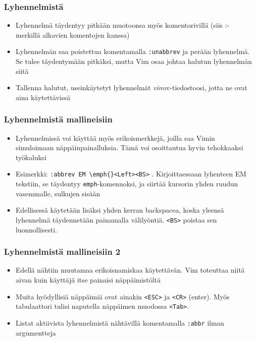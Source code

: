 \documentclass[]{beamer}
\newcommand{\Tohj}[1]{\texttt{#1}}
\newcommand{\com}[1]{{\color{blue!50!black}\Tohj{#1}} \!\!}
\newcommand{\code}[1]{\texttt{#1}}
\begin{document}
\begin{frame}
    \frametitle{Lyhennelmistä}
    \begin{itemize}
        \item Lyhennelmä täydentyy pitkään muotoonsa myös komentorivillä (siis :-merkillä alkavien komentojen kanssa)
        \item Lyhennelmän saa poistettua komentamalla \com{:unabbrev} ja perään lyhennelmä. Se tulee täydentymään pitkäksi, mutta Vim osaa johtaa halutun lyhennelmän siitä
        \item Tallenna halutut, useinkäytetyt lyhennelmät \emph{vimrc}-tiedostoosi, jotta ne ovat aina käytettävissä
    \end{itemize}
\end{frame}

\begin{frame}
    \frametitle{Lyhennelmistä mallineisiin}
    \begin{itemize}
        \item Lyhennelmissä voi käyttää myös erikoismerkkejä, joilla saa Vimin simuloimaan näppäinpainalluksia. Tämä voi osoittautua hyvin tehokkaaksi työkaluksi
        \pause
        \item Esimerkki: \com{:abbrev EM \textbackslash emph\{\}<Left><BS>}. Kirjoittaessaan lyhenteen EM tekstiin, se täydentyy \code{emph}-komennoksi, ja siirtää kursorin yhden ruudun vasemmalle, sulkujen sisään
        \pause
        \item Edellisessä käytetään lisäksi yhden kerran backspacea, koska yleensä lyhennelmä täydennetään painamalla välilyöntiä. \code{<BS>} poistaa sen luonnollisesti.
    \end{itemize}
\end{frame}

\begin{frame}
    \frametitle{Lyhennelmistä mallineisiin 2}
    \begin{itemize}
        \item Edellä nähtiin muutamaa erikoisnamiskaa käytettävän. Vim toteuttaa niitä aivan kuin käyttäjä itse painaisi näppäimistöltä
        \item Muita hyödyllisiä näppäimiä ovat ainakin \code{<ESC>} ja \code{<CR>} (enter). Myös tabulaattori tulisi naputella näppäimen muodossa \code{<Tab>}.
        \pause
        \item Listat aktiivista lyhennelmistä nähtävillä komentamalla \com{:abbr} ilman argumentteja
    \end{itemize}
\end{frame}
\end{document}
